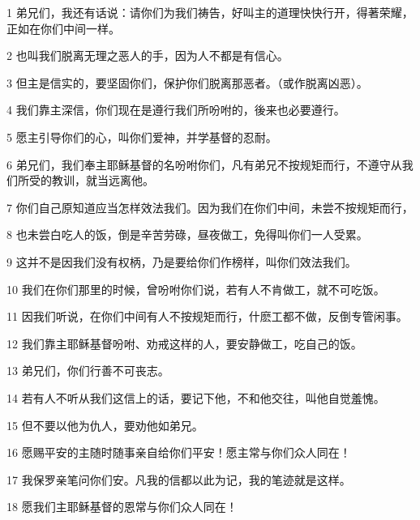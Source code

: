\par 1 弟兄们，我还有话说：请你们为我们祷告，好叫主的道理快快行开，得著荣耀，正如在你们中间一样。
\par 2 也叫我们脱离无理之恶人的手，因为人不都是有信心。
\par 3 但主是信实的，要坚固你们，保护你们脱离那恶者。（或作脱离凶恶）。
\par 4 我们靠主深信，你们现在是遵行我们所吩咐的，後来也必要遵行。
\par 5 愿主引导你们的心，叫你们爱神，并学基督的忍耐。
\par 6 弟兄们，我们奉主耶稣基督的名吩咐你们，凡有弟兄不按规矩而行，不遵守从我们所受的教训，就当远离他。
\par 7 你们自己原知道应当怎样效法我们。因为我们在你们中间，未尝不按规矩而行，
\par 8 也未尝白吃人的饭，倒是辛苦劳碌，昼夜做工，免得叫你们一人受累。
\par 9 这并不是因我们没有权柄，乃是要给你们作榜样，叫你们效法我们。
\par 10 我们在你们那里的时候，曾吩咐你们说，若有人不肯做工，就不可吃饭。
\par 11 因我们听说，在你们中间有人不按规矩而行，什麽工都不做，反倒专管闲事。
\par 12 我们靠主耶稣基督吩咐、劝戒这样的人，要安静做工，吃自己的饭。
\par 13 弟兄们，你们行善不可丧志。
\par 14 若有人不听从我们这信上的话，要记下他，不和他交往，叫他自觉羞愧。
\par 15 但不要以他为仇人，要劝他如弟兄。
\par 16 愿赐平安的主随时随事亲自给你们平安！愿主常与你们众人同在！
\par 17 我保罗亲笔问你们安。凡我的信都以此为记，我的笔迹就是这样。
\par 18 愿我们主耶稣基督的恩常与你们众人同在！


